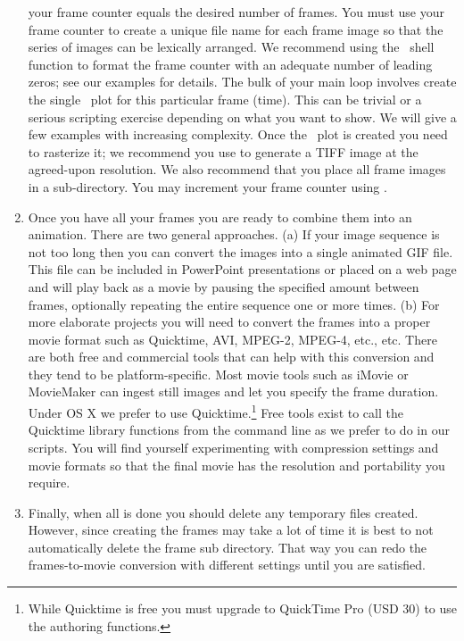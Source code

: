 \begin{enumerate}
your frame counter equals the desired number of frames.  You must use your frame
counter to create a unique file name for each frame image so that the series of
images can be lexically arranged.  We recommend using the \GMT\ shell function
 to format the frame counter
with an adequate number of leading zeros; see our examples for details.  The
bulk of your main loop involves create the single \PS\ plot for this particular
frame (time).  This can be trivial or a serious scripting exercise depending on
what you want to show.  We will give a few examples with increasing complexity.
Once the \PS\ plot is created you need to rasterize it; we recommend you use
 to generate a TIFF image at the agreed-upon resolution.
We also recommend that you place all frame images in a sub-directory. You may increment
your frame counter using .
\item Once you have all your frames you are ready to combine them into an animation.
There are two general approaches. (a) If your image sequence is not too long then
you can convert the images into a single animated GIF file.  This file can be
included in PowerPoint presentations or placed on a web page and will play back
as a movie by pausing the specified amount between frames, optionally repeating
the entire sequence one or more times. (b) For more elaborate projects
you will need to convert the frames into a proper movie format such as Quicktime,
AVI, MPEG-2, MPEG-4, etc., etc.  There are both free and commercial tools that
can help with this conversion and they tend to be platform-specific.  Most movie
tools such as iMovie or MovieMaker can ingest still images and let you specify
the frame duration.  Under OS X we prefer to use Quicktime.\footnote{While Quicktime
is free you must upgrade to QuickTime Pro (USD 30) to use the authoring functions.}  Free
tools exist to call the Quicktime library functions from the command line as we
prefer to do in our scripts.  You will find yourself experimenting with compression
settings and movie formats so that the final movie has the resolution and portability
you require.
\item Finally, when all is done you should delete any temporary files created.
However, since creating the frames may take a lot of time it is best to not automatically
delete the frame sub directory.  That way you can
redo the frames-to-movie conversion with different settings until you are satisfied.
\end{enumerate}
\renewcommand{\labelenumi}{\oldenumi} %

